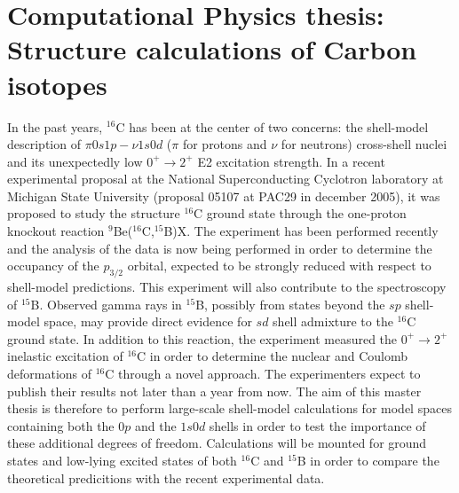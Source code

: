 \newcommand{\OP}[1]{{\bf\widehat{#1}}}

\newcommand{\be}{\begin{equation}}

\newcommand{\ee}{\end{equation}}
\newcommand{\bra}[1]{\left\langle #1 \right|}
\newcommand{\ket}[1]{\left| #1 \right\rangle}
\newcommand{\braket}[2]{\left\langle #1 \right| #2 \right\rangle}




\pagestyle{plain}

\section*{Computational Physics thesis: Structure calculations of Carbon isotopes}

In the past years, $^{16}$C has been 
at the center of two concerns: the shell-model description of $\pi 0s1p-\nu 1s0d$
($\pi$ for protons and $\nu$ for neutrons)
cross-shell nuclei and its unexpectedly low $0^+\rightarrow 2^+$ E2 excitation strength.
In a recent experimental proposal at the National Superconducting Cyclotron laboratory at Michigan
State University (proposal 05107 at PAC29  in december 2005), it was 
proposed to study the structure $^{16}$C ground state 
through the one-proton knockout reaction $^9$Be($^{16}$C,$^{15}$B)X. The experiment has been performed 
recently and the analysis of the data is now being performed in order to 
determine the occupancy of the $p_{3/2}$ orbital, 
expected to be strongly reduced with respect to shell-model
predictions. This experiment will also contribute to 
the spectroscopy of $^{15}$B. Observed gamma rays in $^{15}$B, possibly
from states beyond the $sp$ shell-model space, may provide direct evidence for $sd$ 
shell admixture to the
$^{16}$C ground state. 
In addition to this reaction, the experiment measured  the $0^+\rightarrow 2^+$ 
inelastic excitation of $^{16}$C
in order to determine the nuclear and Coulomb deformations of $^{16}$C through a novel
approach.
The experimenters expect to publish their results not later than a year from now.
The aim of this master thesis is therefore to perform large-scale shell-model calculations
for model spaces containing both the $0p$ and the $1s0d$ shells in order to test 
the importance of these  additional degrees of freedom. Calculations will be mounted for
ground states and low-lying excited states of both $^{16}$C and $^{15}$B
in order to compare the theoretical predicitions with the recent experimental data.

